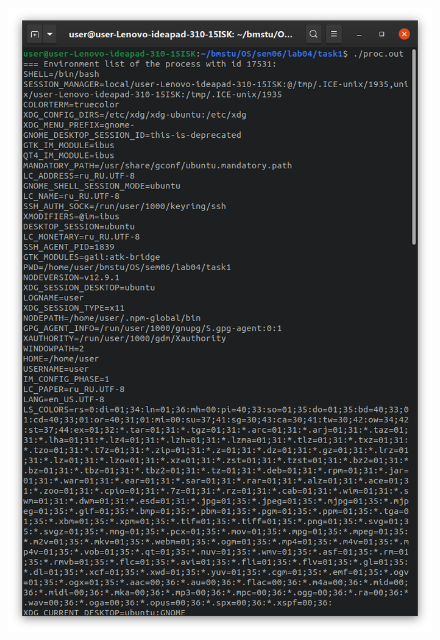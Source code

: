 \documentclass[a4paper,oneside,12pt]{extreport}
\begin{document}
\begin{figure}[H]
	\centering
	\includegraphics[scale=0.325]{inc/img/task1-environ1}

\end{figure}
\end{document}
